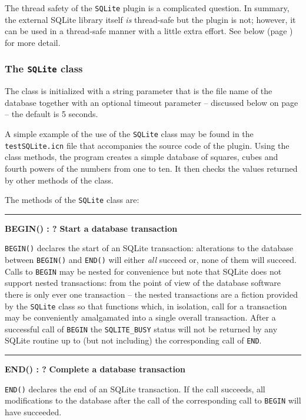 The thread safety of the \texttt{SQLite} plugin is a complicated question.
In summary, the external SQLite library itself {\em is\/} thread-safe but the
plugin is not; \WarningNotThreadSafe however, it can be used in a thread-safe
manner with a little extra effort.  See below (page \pageref{SQLite_ThreadSafety})
for more detail.

\subsubsection{The \texttt{SQLite} class}
\label{SQLiteClass}
The class is initialized with a string parameter that is the file name of the
database together with an optional timeout parameter -- discussed below on page
\pageref{SQLite_Timeout}  -- the default is 5 seconds.

\noindent
A simple example of the use of the \texttt{SQLite} class may be found in the
\texttt{testSQLite.icn} file that accompanies the source code of the plugin.
Using the class methods, the program creates a simple database of squares, cubes
and fourth powers of the numbers from one to ten. It then checks the values
returned by other methods of the class.

\noindent
The methods of the \texttt{SQLite} class are:
\bigskip\hrule\vspace{0.1cm}
\noindent
{\bf BEGIN() : ? } \hfill {\bf Start a database transaction}

\noindent
\texttt{BEGIN()} declares the start of an SQLite transaction: alterations to
the database between \texttt{BEGIN()} and \texttt{END()} will either {\em
  all\/} succeed or, none of them will succeed. Calls to \texttt{BEGIN} may
be nested for convenience but note that SQLite does not support nested
transactions: from the point of view of the database software there is only
ever one transaction -- the nested transactions are a fiction provided by the
\texttt{SQLite} class so that functions which, in isolation, call for a
transaction may be conveniently amalgamated into a single overall transaction.
After a successful call of \texttt{BEGIN} the \texttt{SQLITE\_BUSY} status will
not be returned by any SQLite routine up to (but not including) the
corresponding call of \texttt{END}.

\bigskip\hrule\vspace{0.1cm}
\noindent
{\bf END() : ? } \hfill {\bf Complete a database transaction}

\noindent
\texttt{END()} declares the end of an SQLite transaction. If the call
succeeds, all modifications to the database after the call of the
corresponding call to \texttt{BEGIN} will have succeeded.


